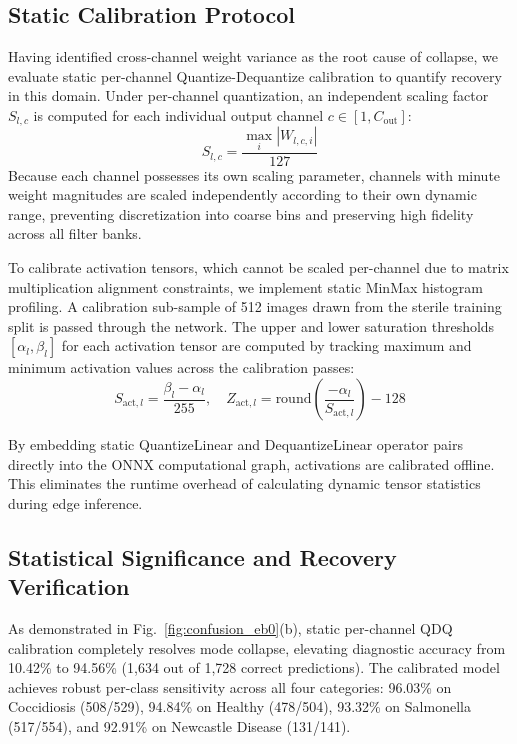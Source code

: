 \documentclass{jcse}
\begin{document}
\subsection{Static Calibration Protocol}
Having identified cross-channel weight variance as the root cause of collapse, we evaluate static per-channel Quantize-Dequantize calibration to quantify recovery in this domain. Under per-channel quantization, an independent scaling factor $S_{l,c}$ is computed for each individual output channel $c \in [1, C_{\text{out}}]$:
\begin{equation}
S_{l,c} = \frac{\max_{i} |W_{l,c,i}|}{127}
\end{equation}
Because each channel possesses its own scaling parameter, channels with minute weight magnitudes are scaled independently according to their own dynamic range, preventing discretization into coarse bins and preserving high fidelity across all filter banks.

To calibrate activation tensors, which cannot be scaled per-channel due to matrix multiplication alignment constraints, we implement static MinMax histogram profiling. A calibration sub-sample of 512 images drawn from the sterile training split is passed through the network. The upper and lower saturation thresholds $[\alpha_l, \beta_l]$ for each activation tensor are computed by tracking maximum and minimum activation values across the calibration passes:
\begin{equation}
S_{\text{act},l} = \frac{\beta_l - \alpha_l}{255}, \quad Z_{\text{act},l} = \text{round}\left( \frac{-\alpha_l}{S_{\text{act},l}} \right) - 128
\end{equation}

By embedding static QuantizeLinear and DequantizeLinear operator pairs directly into the ONNX computational graph, activations are calibrated offline. This eliminates the runtime overhead of calculating dynamic tensor statistics during edge inference.

\subsection{Statistical Significance and Recovery Verification}
As demonstrated in Fig.~\ref{fig:confusion_eb0}(b), static per-channel QDQ calibration completely resolves mode collapse, elevating diagnostic accuracy from 10.42\% to 94.56\% (1,634 out of 1,728 correct predictions). The calibrated model achieves robust per-class sensitivity across all four categories: 96.03\% on Coccidiosis (508/529), 94.84\% on Healthy (478/504), 93.32\% on Salmonella (517/554), and 92.91\% on Newcastle Disease (131/141).
\end{document}
